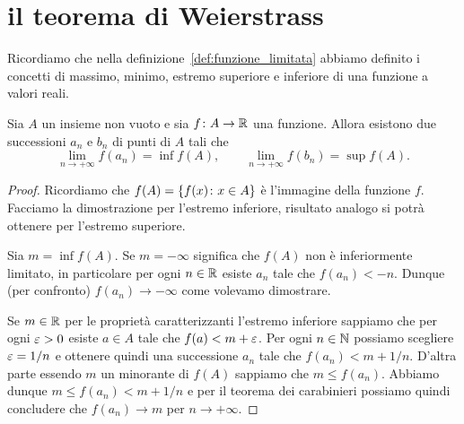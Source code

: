 \section{il teorema di Weierstrass}
    
Ricordiamo che nella definizione~\ref{def:funzione_limitata}
abbiamo definito i concetti di massimo, minimo, estremo superiore
e inferiore di una funzione a valori reali.

\begin{lemma}%
%
%
%
Sia $A$ un insieme non vuoto e
sia $f\colon A \to {\mathbb R}$ una funzione. Allora esistono
due successioni $a_n$ e $b_n$ di punti di $A$ tali che
\[
  \lim_{n\to +\infty} f(a_n) = \inf f(A), \qquad
  \lim_{n\to +\infty} f(b_n) = \sup f(A).
\]
\end{lemma}
%
\begin{proof}
Ricordiamo che $f(A) = {\left\{ f(x)\colon x \in A \right\}}$ è l'immagine
della funzione $f$. Facciamo la dimostrazione per l'estremo inferiore,
risultato analogo si potrà ottenere per l'estremo superiore.

Sia $m=\inf f(A)$.
Se $m=-\infty$ significa che $f(A)$ non è inferiormente limitato,
in particolare per ogni $n\in {\mathbb R}$ esiste $a_n$ tale che
$f(a_n) < - n$.
Dunque (per confronto) $f(a_n) \to -\infty$
come volevamo dimostrare.

Se $m\in {\mathbb R}$ per le proprietà caratterizzanti l'estremo inferiore
sappiamo che per ogni $\varepsilon>0$ esiste $a\in A$ tale che
$f(a) < m + \varepsilon$.
Per ogni $n\in{\mathbb N}$ possiamo scegliere $\varepsilon=1/n$ e ottenere quindi
una successione $a_n$ tale che $f(a_n) < m + 1/n$.
D'altra parte essendo $m$ un minorante di $f(A)$ sappiamo che
$m \le f(a_n)$.
Abbiamo dunque $m \le f(a_n) < m+ 1/n$ e per il teorema dei
carabinieri possiamo quindi concludere che $f(a_n) \to m$
per $n\to +\infty$.
\end{proof}

